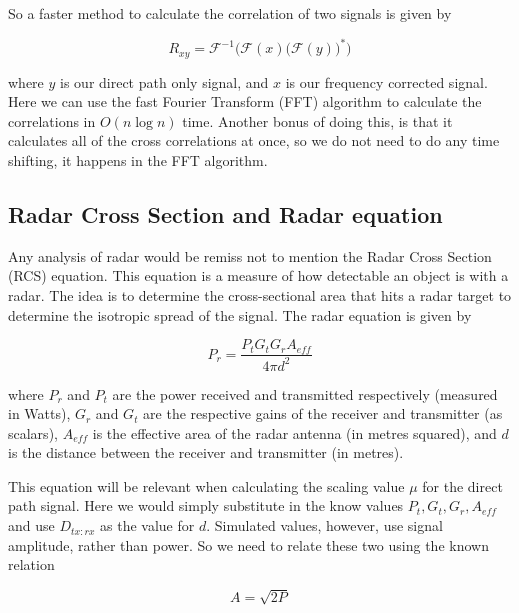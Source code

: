 \documentclass[12pt,openany,a4paper]{book}
\begin{document}
\bigskip

So a faster method to calculate the correlation of two signals is given by

\begin{equation}
R_{xy} = \mathcal{F}^{-1} \Bigg( \mathcal{F}(x) \bigg(\mathcal{F}(y)\bigg)^* \Bigg)
\end{equation}

\bigskip

where $y$ is our direct path only signal, and $x$ is our frequency corrected signal. Here we can use the fast Fourier Transform (FFT) algorithm to calculate the correlations in $O (n \log n)$ time. Another bonus of doing this, is that it calculates all of the cross correlations at once, so we do not need to do any time shifting, it happens in the FFT algorithm.

\subsection{Radar Cross Section and Radar equation}
\label{sec:RCSeqn}
Any analysis of radar would be remiss not to mention the Radar Cross Section (RCS) equation. This equation is a measure of how detectable an object is with a radar. The idea is to determine the cross-sectional area that hits a radar target to determine the isotropic spread of the signal. The radar equation is given by

\begin{equation}
\label{eqn:rcs1}
P_r = \frac{P_tG_tG_rA_{eff}}{4\pi d^2}
\end{equation}

\bigskip

where $P_r$ and $P_t$ are the power received and transmitted respectively (measured in Watts), $G_r$ and $G_t$ are the respective gains of the receiver and transmitter (as scalars), $A_{eff}$ is the effective area of the radar antenna (in metres squared), and $d$ is the distance between the receiver and transmitter (in metres).

\bigskip

This equation will be relevant when calculating the scaling value $\mu$ for the direct path signal. Here we would simply substitute in the know values $P_t,G_t,G_r,A_{eff}$ and use $D_{tx\colon rx}$ as the value for $d$. Simulated values, however, use signal amplitude, rather than power. So we need to relate these two using the known relation

\begin{equation}
A = \sqrt{2P}
\end{equation}
\end{document}
